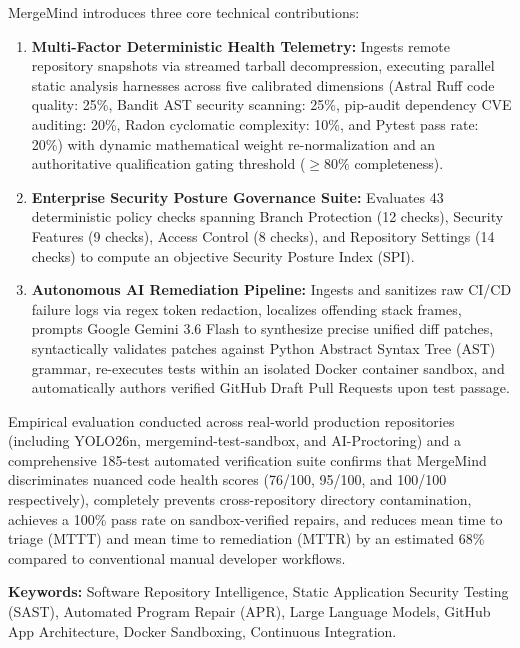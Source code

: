 \vspace{0.4cm}
MergeMind introduces three core technical contributions:
\begin{enumerate}
    \item \textbf{Multi-Factor Deterministic Health Telemetry:} Ingests remote repository snapshots via streamed tarball decompression, executing parallel static analysis harnesses across five calibrated dimensions (Astral Ruff code quality: 25\%, Bandit AST security scanning: 25\%, pip-audit dependency CVE auditing: 20\%, Radon cyclomatic complexity: 10\%, and Pytest pass rate: 20\%) with dynamic mathematical weight re-normalization and an authoritative qualification gating threshold ($\ge 80\%$ completeness).
    \item \textbf{Enterprise Security Posture Governance Suite:} Evaluates 43 deterministic policy checks spanning Branch Protection (12 checks), Security Features (9 checks), Access Control (8 checks), and Repository Settings (14 checks) to compute an objective Security Posture Index (SPI).
    \item \textbf{Autonomous AI Remediation Pipeline:} Ingests and sanitizes raw CI/CD failure logs via regex token redaction, localizes offending stack frames, prompts Google Gemini 3.6 Flash to synthesize precise unified diff patches, syntactically validates patches against Python Abstract Syntax Tree (AST) grammar, re-executes tests within an isolated Docker container sandbox, and automatically authors verified GitHub Draft Pull Requests upon test passage.
\end{enumerate}

\vspace{0.4cm}
Empirical evaluation conducted across real-world production repositories (including YOLO26n, mergemind-test-sandbox, and AI-Proctoring) and a comprehensive 185-test automated verification suite confirms that MergeMind discriminates nuanced code health scores (76/100, 95/100, and 100/100 respectively), completely prevents cross-repository directory contamination, achieves a 100\% pass rate on sandbox-verified repairs, and reduces mean time to triage (MTTT) and mean time to remediation (MTTR) by an estimated 68\% compared to conventional manual developer workflows.

\vspace{0.6cm}
\noindent\textbf{Keywords:} Software Repository Intelligence, Static Application Security Testing (SAST), Automated Program Repair (APR), Large Language Models, GitHub App Architecture, Docker Sandboxing, Continuous Integration.

